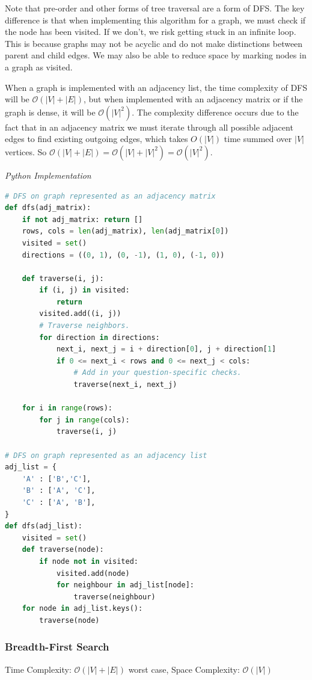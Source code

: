 \documentclass{article}
\newcommand{\bigO}{\mathcal{O}}
\begin{document}
    Note that pre-order and other forms of tree traversal are a form of DFS. The key difference is that when implementing this algorithm for a graph, we must check if the node has been visited. If we don't, we risk getting stuck in an infinite loop. This is because graphs may not be acyclic and do not make distinctions between parent and child edges. We may also be able to reduce space by marking nodes in a graph as visited.
    
    When a graph is implemented with an adjacency list, the time complexity of DFS will be $\bigO(|V| + |E|)$, but when implemented with an adjacency matrix or if the graph is dense, it will be $\bigO(|V|^2)$. The complexity difference occurs due to the fact that in an adjacency matrix we must iterate through all possible adjacent edges to find existing outgoing edges, which takes $O(|V|)$ time summed over $|V|$ vertices. So $\bigO(|V| + |E|) = \bigO(|V| + |V|^2) = \bigO(|V|^2)$.
    
\vspace{8pt} \emph{Python Implementation}
\begin{lstlisting}[language=Python]
# DFS on graph represented as an adjacency matrix 
def dfs(adj_matrix):
    if not adj_matrix: return []
    rows, cols = len(adj_matrix), len(adj_matrix[0])
    visited = set()
    directions = ((0, 1), (0, -1), (1, 0), (-1, 0))

    def traverse(i, j):
        if (i, j) in visited:
            return
        visited.add((i, j))
        # Traverse neighbors.
        for direction in directions:
            next_i, next_j = i + direction[0], j + direction[1]
            if 0 <= next_i < rows and 0 <= next_j < cols:
                # Add in your question-specific checks.
                traverse(next_i, next_j)

    for i in range(rows):
        for j in range(cols):
            traverse(i, j)

# DFS on graph represented as an adjacency list
adj_list = {
    'A' : ['B','C'],
    'B' : ['A', 'C'],
    'C' : ['A', 'B'],
}
def dfs(adj_list):
    visited = set()
    def traverse(node):
        if node not in visited:
            visited.add(node)
            for neighbour in adj_list[node]:
                traverse(neighbour)
    for node in adj_list.keys():
        traverse(node)
\end{lstlisting}

    \subsubsection{Breadth-First Search}
    Time Complexity: $\bigO(|V| + |E|)$ worst case, Space Complexity: $\bigO(|V|)$
\end{document}
